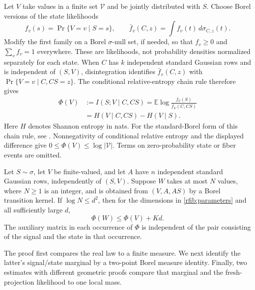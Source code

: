 Let \(V\) take values in a finite set \(\mathcal V\) and be jointly
distributed with \(S\).  Choose Borel versions of the state likelihoods
\[
 f_v(s)=\Pr\{V=v\mid S=s\},\qquad
 \bar f_v(C,z)=\int f_v(t)\,d\sigma_{C,z}(t).
\]
Modify the first family on a Borel \(\sigma\)-null set, if needed, so
that \(f_v\ge0\) and \(\sum_v f_v=1\) everywhere.
These are likelihoods, not probability densities normalized separately
for each state.  When \(C\) has \(k\) independent standard Gaussian rows
and is independent of \((S,V)\), disintegration identifies
\(\bar f_v(C,z)\) with \(\Pr\{V=v\mid C,CS=z\}\).  The conditional
relative-entropy chain rule therefore gives
\begin{equation}\label{rfib:potential}
 \begin{aligned}
 \Phi(V)&:=I(S;V\mid C,CS)
 =\mathbb E\log\frac{f_V(S)}{\bar f_V(C,CS)}\\
 &=H(V\mid C,CS)-H(V\mid S).
 \end{aligned}
\end{equation}
Here \(H\) denotes Shannon entropy in nats.  For the standard-Borel form of this chain rule, see
\cite[Section~3.3]{Austin2020}.  Nonnegativity of conditional relative
entropy and the displayed difference give
\(0\le\Phi(V)\le\log|\mathcal V|\).  Terms on
zero-probability state or fiber events are omitted.

\begin{proposition}\label{rfib:block}
Let \(S\sim\sigma\), let \(V\) be finite-valued, and let \(A\) have
\(n\) independent standard Gaussian rows, independently of \((S,V)\).
Suppose \(W\) takes at most \(N\) values, where \(N\ge1\) is an integer, and is obtained from
\((V,A,AS)\) by a Borel transition kernel.  If \(\log N\le d^2\), then
for the dimensions in \eqref{rfib:parameters} and all sufficiently
large \(d\),
\begin{equation}\label{rfib:drift}
 \Phi(W)\le\Phi(V)+Kd .
\end{equation}
The auxiliary matrix in each occurrence of \(\Phi\) is independent of
the pair consisting of the signal and the state in that occurrence.
\end{proposition}

The proof first compares the real law to a finite measure.  We next
identify the latter's signal/state marginal by a two-point Borel measure
identity.  Finally, two estimates with different geometric proofs compare
that marginal and the fresh-projection likelihood to one local mass.

